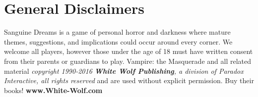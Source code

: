 \section[Copyright Disclaimer]{General Disclaimers}
\noindent Sanguine Dreams is a game of personal horror and darkness where mature themes, 
suggestions, and implications could occur around every corner.  We welcome all players, 
however those under the age of 18 must have written consent from their parents or 
guardians to play.  Vampire:  the Masquerade and all related material 
\emph{copyright 1990-2016 \textbf{White Wolf Publishing}, a division of Paradox Interactive, 
all rights reserved} and are used without explicit permission.  Buy their books!  
\textbf{www.White-Wolf.com}
